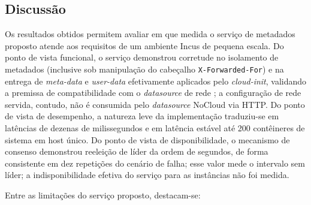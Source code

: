 \subsection{Discussão}
\label{subsec_discussao}

Os resultados obtidos permitem avaliar em que medida o serviço de metadados proposto atende aos requisitos de um ambiente Incus de pequena escala. Do ponto de vista funcional, o serviço demonstrou corretude no isolamento de metadados (inclusive sob manipulação do cabeçalho \texttt{X-Forwarded-For}) e na entrega de \textit{meta-data} e \textit{user-data} efetivamente aplicados pelo \textit{cloud-init}, validando a premissa de compatibilidade com o \textit{datasource} de rede \citep{cloudinit2024}; a configuração de rede servida, contudo, não é consumida pelo \textit{datasource} NoCloud via HTTP. Do ponto de vista de desempenho, a natureza leve da implementação traduziu-se em latências de dezenas de milissegundos e em latência estável até 200 contêineres de sistema em host único. Do ponto de vista de disponibilidade, o mecanismo de consenso demonstrou reeleição de líder da ordem de segundos, de forma consistente em dez repetições do cenário de falha; esse valor mede o intervalo sem líder; a indisponibilidade efetiva do serviço para as instâncias não foi medida.

Entre as limitações do serviço proposto, destacam-se:

